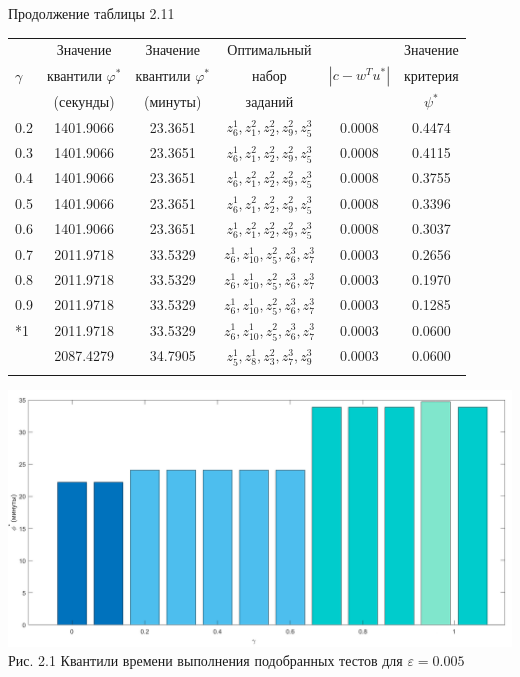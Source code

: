 \documentclass[14pt, a4paper]{extarticle}
\numberwithin{equation}{section}
\begin{document}
{\begin{table}[h!]
\centering
\begin{flushright}
Продолжение таблицы 2.11
\end{flushright}
\begin{tabular}{|>{\centering}m{30pt}|c|c|c|c|c|}
\hline
			&Значение  						   &Значение   				&Оптимальный&				  &Значение \\
$\gamma$	&квантили $\varphi^\ast$           &квантили $\varphi^\ast$ &набор 		&$|c-w^T u^\ast|$ &критерия  \\
			&(секунды)						   &(минуты)  				& заданий   &				  &$\psi^\ast$ \\ \cline{1-6}
0.2					& 1401.9066		& 23.3651		& $z^1_6, z^2_1, z^2_2, z^2_9, z^3_5$		& 0.0008			& 0.4474 \\ \cline{1-6}
0.3					& 1401.9066		& 23.3651		& $z^1_6, z^2_1, z^2_2, z^2_9, z^3_5$		& 0.0008			& 0.4115 \\ \cline{1-6}
0.4					& 1401.9066		& 23.3651		& $z^1_6, z^2_1, z^2_2, z^2_9, z^3_5$		& 0.0008			& 0.3755 \\ \cline{1-6}
0.5					& 1401.9066		& 23.3651		& $z^1_6, z^2_1, z^2_2, z^2_9, z^3_5$		& 0.0008			& 0.3396 \\ \cline{1-6}
0.6					& 1401.9066		& 23.3651		& $z^1_6, z^2_1, z^2_2, z^2_9, z^3_5$		& 0.0008			& 0.3037 \\ \cline{1-6}
0.7					& 2011.9718		& 33.5329		& $z^1_6, z^1_{10}, z^2_5, z^3_6, z^3_7$	& 0.0003			& 0.2656 \\ \cline{1-6}
0.8					& 2011.9718		& 33.5329		& $z^1_6, z^1_{10}, z^2_5, z^3_6, z^3_7$	& 0.0003			& 0.1970 \\ \cline{1-6}
0.9					& 2011.9718		& 33.5329		& $z^1_6, z^1_{10}, z^2_5, z^3_6, z^3_7$	& 0.0003			& 0.1285 \\ \cline{1-6}
\multirow{2}*{1}	& 2011.9718		& 33.5329		& $z^1_6, z^1_{10}, z^2_5, z^3_6, z^3_7$	& 0.0003			& 0.0600 \\ \cline{2-6}
					& 2087.4279		& 34.7905		& $z^1_5, z^1_8, z^2_3, z^3_7, z^3_9$		& 0.0003			& 0.0600 \\ \cline{1-6}
\end{tabular}
\label{ch2}
\end{table}

\begin{center}
\includegraphics[scale=0.38]{2.png}
Рис. 2.1 Квантили времени выполнения подобранных тестов для $\varepsilon=0.005$
\end{center}



}
\end{document}
